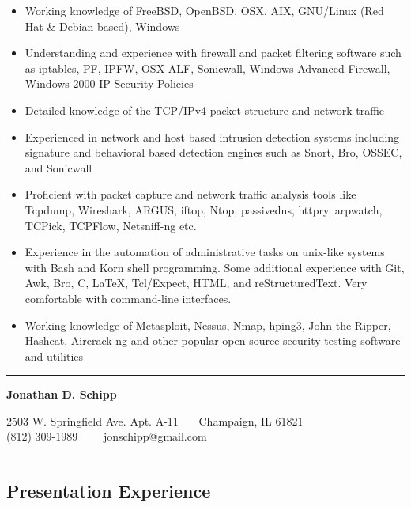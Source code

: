 \documentclass[10pt,letterpaper]{article}
\begin{document}
\begin{itemize}
	\parskip=0.1em

	\item Working knowledge of FreeBSD, OpenBSD, OSX, AIX, GNU/Linux (Red Hat \& Debian based), Windows
	\item Understanding and experience with firewall and packet filtering software such as iptables, PF, IPFW, OSX ALF, Sonicwall, Windows Advanced Firewall, Windows 2000 IP Security Policies
	\item Detailed knowledge of the TCP/IPv4 packet structure and network traffic
	\item Experienced in network and host based intrusion detection systems
including signature and behavioral based detection engines such as Snort, Bro, OSSEC, and Sonicwall
	\item Proficient with packet capture and network traffic analysis tools like Tcpdump, Wireshark, ARGUS, iftop, Ntop, passivedns, httpry, arpwatch, TCPick, TCPFlow, Netsniff-ng etc.
	\item Experience in the automation of administrative tasks on unix-like
systems with Bash and Korn shell programming. Some additional experience with Git, Awk, Bro, C, \LaTeX, Tcl/Expect, HTML, and reStructuredText. Very comfortable with command-line interfaces.
	\item Working knowledge of Metasploit, Nessus, Nmap, hping3, John the Ripper, Hashcat, Aircrack-ng and other popular open source security testing software and utilities
\end{itemize}

\hrule
\vspace{-0.4em}

\begin{center}
{\LARGE \textbf{Jonathan D. Schipp}}

2503 W. Springfield Ave. Apt. A-11\ \textbullet
\ \ Champaign, IL 61821
\\
(812) 309-1989\ \ \textbullet
\ \ jonschipp@gmail.com
\end{center}

\hrule
\vspace{-0.4em}
\subsection*{Presentation Experience}
\end{document}
